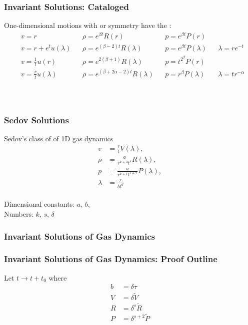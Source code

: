 \begin{frame}\frametitle{Invariant Solutions: Cataloged}
One-dimensional motions with  or  symmetry have  the :
\small{
\begin{equation}
\begin{array}{clclclcl}
	&v = r 				&& \rho = e^{\beta t}R(r) 					&& p = e^{\beta t}P(r) \\[8pt]
	&v = r + e^{t}u(\lambda) 	&& \rho = e^{(\beta-2) t}R(\lambda) 			&& p = e^{\beta t}P(\lambda)	&& \lambda = r e^{-t}\\[8pt]
	&v = \frac{1}{t}u(r) 		&& \rho = e^{2(\beta+1)}R(\lambda) 			&& p = t^{2^{\beta}}P(r) \\[8pt]
	&v =\frac{r}{t}u(\lambda) 	&& \rho = e^{(\beta+2\alpha-2) t}R(\lambda) 	&& p = r^{\beta}P(\lambda)	&& \lambda = tr^{-\alpha}\\
\end{array}
\label{eq:invariant solutions}
\end{equation}
}
\\[20pt]
\cite[p. 51, 1.134-137]{korobeuinikov1976problems} \\
\cite{ovsjannikov1962group}
\end{frame}
%
\begin{frame}\frametitle{Sedov Solutions}
Sedov's class of  of 1D gas dynamics
\begin{equation}
\begin{split}
	v &= \frac{r}{t}		V(\lambda), \\
	\rho &= \frac{a}{r^{k+3}t^{s}}	R(\lambda), \\
	p &= \frac{a}{r^{k+1}t^{s+2}}	P(\lambda), \\
	\lambda &= \frac{r}{b t^{d}}
\end{split}
\label{eq:sedov}
\end{equation}
\ \\
Dimensional constants: $a$, $b$, \\
Numbers: $k$, $s$, $\delta$
\end{frame}
%
\begin{frame}\frametitle{Invariant Solutions of Gas Dynamics}
\end{frame}
%
\begin{frame}\frametitle{Invariant Solutions of Gas Dynamics: Proof Outline}
Let $t\to t + t_{0}$ where
\begin{equation}
\begin{split}
	b &= \delta \tau \\
	V &= \delta \tilde{V} \\
	R &= \delta^{s} \tilde{R} \\
	P &= \delta^{s+2} \tilde{P}
\end{split}
\label{eq:proof-subs}
\end{equation}
\end{frame}
